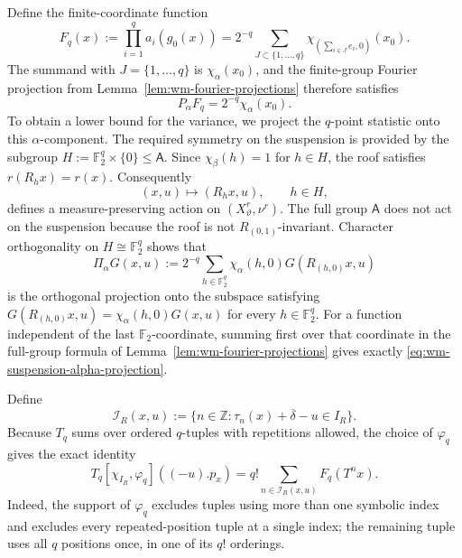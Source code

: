 \documentclass[11pt,reqno,a4paper]{amsart}
\numberwithin{equation}{section}
\theoremstyle{compact}
\theoremstyle{definition}
\theoremstyle{definition}
\begin{document}
Define the finite-coordinate function
\begin{equation}\label{eq:wm-exceptional-function}
  F_q(x)
  :=\prod_{i=1}^q a_i(g_0(x))
  =2^{-q}\sum_{J\subset\{1,\ldots,q\}}
       \chi_{(\sum_{i\in J}e_i,0)}(x_0).
\end{equation}
The summand with $J=\{1,\ldots,q\}$ is $\chi_\alpha(x_0)$, and the
finite-group Fourier projection from
Lemma~\ref{lem:wm-fourier-projections} therefore satisfies
\begin{equation}\label{eq:wm-exceptional-alpha-component}
  P_\alpha F_q=2^{-q}\chi_\alpha(x_0).
\end{equation}
To obtain a lower bound for the variance, we project the $q$-point statistic
onto this $\alpha$-component.  The required symmetry on the suspension is
provided by the subgroup
$H:=\mathbb F_2^q\times\{0\}\leq\mathsf A$.  Since
$\chi_\beta(h)=1$ for $h\in H$, the roof satisfies $r(R_hx)=r(x)$.
Consequently
\[
  (x,u)\longmapsto(R_hx,u),\qquad h\in H,
\]
defines a measure-preserving action on $(X_\vartheta^r,\nu^r)$.  The full
group $\mathsf A$ does not act on the suspension because the roof is not
$R_{(0,1)}$-invariant.  Character orthogonality on
$H\cong\mathbb F_2^q$ shows that
\begin{equation}\label{eq:wm-suspension-alpha-projection}
  \Pi_\alpha G(x,u)
  :=2^{-q}\sum_{h\in\mathbb F_2^q}
       \chi_\alpha(h,0)G(R_{(h,0)}x,u)
\end{equation}
is the orthogonal projection onto the subspace satisfying
$G(R_{(h,0)}x,u)=\chi_\alpha(h,0)G(x,u)$ for every $h\in\mathbb F_2^q$.
For a function independent of the last $\mathbb F_2$-coordinate, summing
first over that coordinate in the full-group formula of
Lemma~\ref{lem:wm-fourier-projections} gives exactly
\eqref{eq:wm-suspension-alpha-projection}.

Define
\begin{equation}\label{eq:wm-selected-index-set}
  \mathcal I_R(x,u)
  :=\{n\in\mathbb Z:\tau_n(x)+\overline\delta-u\in I_R\}.
\end{equation}
Because $T_q$ sums over ordered $q$-tuples with repetitions allowed, the
choice of $\varphi_q$ gives the exact identity
\begin{equation}\label{eq:wm-exact-full-cluster-statistic}
  T_q[\chi_{I_R},\varphi_q]((-u).p_x)
  =q!\sum_{n\in\mathcal I_R(x,u)}F_q(T^nx).
\end{equation}
Indeed, the support of $\varphi_q$ excludes tuples using more than one
symbolic index and excludes every repeated-position tuple at a single
index; the remaining tuple uses all $q$ positions once, in one of its $q!$
orderings.
\end{document}
